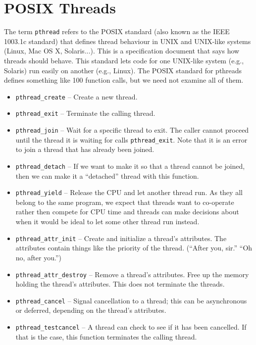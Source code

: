 




\section*{POSIX Threads}

The term \texttt{pthread} refers to the POSIX standard (also known as the IEEE 1003.1c standard) that defines thread behaviour in UNIX and UNIX-like systems (Linux, Mac OS X, Solaris...). This is a specification document that says how threads should behave. This standard lets code for one UNIX-like system (e.g., Solaris) run easily on another (e.g., Linux). The POSIX standard for pthreads defines something like 100 function calls, but we need not examine all of them. 

\begin{itemize}
	\item \texttt{pthread\_create} -- Create a new thread. 
	\item \texttt{pthread\_exit} -- Terminate the calling thread.
	\item \texttt{pthread\_join} -- Wait for a specific thread to exit. The caller cannot proceed until the thread it is waiting for calls \texttt{pthread\_exit}. Note that it is an error to join a thread that has already been joined.
	\item \texttt{pthread\_detach} -- If we want to make it so that a thread cannot be joined, then we can make it a ``detached'' thread with this function.
	\item \texttt{pthread\_yield} -- Release the CPU and let another thread run. As they all belong to the same program, we expect that threads want to co-operate rather then compete for CPU time and threads can make decisions about when it would be ideal to let some other thread run instead.
	\item \texttt{pthread\_attr\_init} -- Create and initialize a thread's attributes. The attributes contain things like the priority of the thread. (``After you, sir.'' ``Oh no, after you.'')
	\item \texttt{pthread\_attr\_destroy} -- Remove a thread's attributes. Free up the memory holding the thread's attributes. This does not terminate the threads.
	\item \texttt{pthread\_cancel} -- Signal cancellation to a thread; this can be asynchronous or deferred, depending on the thread's attributes.
	\item \texttt{pthread\_testcancel} -- A thread can check to see if it has been cancelled. If that is the case, this function terminates the calling thread.
\end{itemize}

